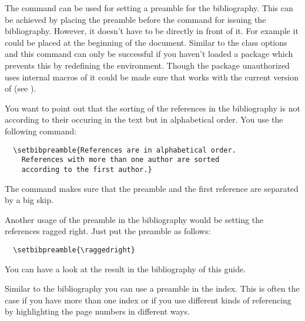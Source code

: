 \begin{Declaration}
\end{Declaration}%
%
The command  can be used for setting a preamble
for the bibliography. This can be achieved by
placing the preamble before the command for issuing the bibliography.
However, it doesn't have to be directly in front of it. For example it
could be placed at the beginning of the document. Similar to the class
options  and  this command
can only be successful if you haven't loaded a package which prevents
this by redefining the  environment.
Though the  package  unauthorized
uses internal macros of {\KOMAScript} it could be made sure that
 works with the current version of
 (see \cite{package:natbib}).

\begin{Example}
  You want to point out that the sorting of the references in the
  bibliography is not according to their occuring in the text but in
  alphabetical order. You use the following command:
\begin{lstlisting}
  \setbibpreamble{References are in alphabetical order.
    References with more than one author are sorted
    according to the first author.}
\end{lstlisting}
  The  command makes sure that the
  preamble and the first reference are separated by a big skip.
  
  Another usage of the preamble in the bibliography would be setting
  the references ragged right. Just put the preamble as follows:
\begin{lstlisting}
  \setbibpreamble{\raggedright}
\end{lstlisting}
  You can have a look at the result in the bibliography of this guide.
\end{Example}
%


\begin{Declaration}
\end{Declaration}%
%
Similar to the bibliography you can use a preamble in the index. This
is often the case if you have more than one index or if you use
different kinds of referencing by highlighting the page numbers in
different ways.

